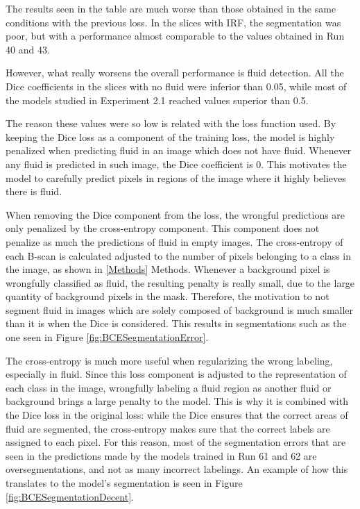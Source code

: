 The results seen in the table are much worse than those obtained in the same conditions with the previous loss. In the slices with IRF, the segmentation was poor, but with a performance almost comparable to the values obtained in Run 40 and 43.
\par
However, what really worsens the overall performance is fluid detection. All the Dice coefficients in the slices with no fluid were inferior than 0.05, while most of the models studied in Experiment 2.1 reached values superior than 0.5.
\par
The reason these values were so low is related with the loss function used. By keeping the Dice loss as a component of the training loss, the model is highly penalized when predicting fluid in an image which does not have fluid. Whenever any fluid is predicted in such image, the Dice coefficient is 0. This motivates the model to carefully predict pixels in regions of the image where it highly believes there is fluid.
\par
When removing the Dice component from the loss, the wrongful predictions are only penalized by the cross-entropy component. This component does not penalize as much the predictions of fluid in empty images. The cross-entropy of each B-scan is calculated adjusted to the number of pixels belonging to a class in the image, as shown in \ref{Methods} Methods. Whenever a background pixel is wrongfully classified as fluid, the resulting penalty is really small, due to the large quantity of background pixels in the mask. Therefore, the motivation to not segment fluid in images which are solely composed of background is much smaller than it is when the Dice is considered. This results in segmentations such as the one seen in Figure \ref{fig:BCESegmentationError}.
\par
The cross-entropy is much more useful when regularizing the wrong labeling, especially in fluid. Since this loss component is adjusted to the representation of each class in the image, wrongfully labeling a fluid region as another fluid or background brings a large penalty to the model. This is why it is combined with the Dice loss in the original loss: while the Dice ensures that the correct areas of fluid are segmented, the cross-entropy makes sure that the correct labels are assigned to each pixel. For this reason, most of the segmentation errors that are seen in the predictions made by the models trained in Run 61 and 62 are oversegmentations, and not as many incorrect labelings. An example of how this translates to the model's segmentation is seen in Figure \ref{fig:BCESegmentationDecent}.

